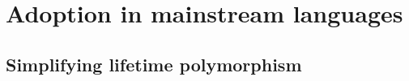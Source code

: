 \documentclass[acmsmall]{acmart}
\begin{document}




%










\section{Adoption in mainstream languages} \label{sec:mainstream}


\subsection{Simplifying lifetime polymorphism} \label{subsec:lifetime-elision}
\end{document}

